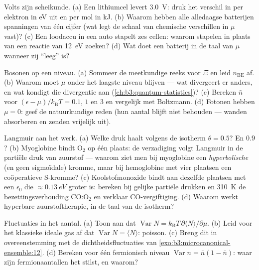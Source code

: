 \begin{exercise}[$\star$]\label{exo:b3:grand-canonical:4}
Volts zijn scheikunde. (a) Een lithiumcel levert \qty{3.0}{V}: druk het
verschil in  per elektron in eV uit en per mol in kJ.
(b) Waarom hebben alle alledaagse batterijen spanningen van één cijfer
(wat legt de schaal van chemische verschillen in $\mu$ vast)? (c) Een
loodaccu in een auto stapelt zes cellen: waarom stapelen in plaats van een
reactie van \qty{12}{eV} zoeken? (d) Wat doet een batterij in de taal van
$\mu$ wanneer zij ``leeg'' is?
\end{exercise}

\begin{exercise}[$\star\star$]\label{exo:b3:grand-canonical:5}
Bosonen op een niveau. (a) Sommeer de meetkundige reeks voor $\Xi$ en leid
$\bar n_{\text{BE}}$ af. (b) Waarom moet $\mu$ onder het laagste niveau
blijven --- wat divergeert er anders, en wat kondigt die divergentie aan
(\cref{ch:b3:quantum-statistics})? (c) Bereken $\bar n$ voor $(\epsilon - \mu)/k_{\text{B}}T = 0.1$, $1$ en $3$ en vergelijk met Boltzmann. (d)
Fotonen hebben $\mu = 0$: geef de natuurkundige reden (hun aantal blijft
niet behouden --- wanden absorberen en zenden vrijelijk uit).
\end{exercise}

\begin{exercise}[$\star\star$]\label{exo:b3:grand-canonical:6}
Langmuir aan het werk. (a) Welke druk haalt volgens de isotherm $\theta = 0.5$? En $0.9$? (b) Myoglobine bindt O$_2$ op één plaats: de verzadiging
volgt Langmuir in de partiële druk van zuurstof --- waarom ziet men bij
myoglobine een \emph{hyperbolische} (en geen sigmoïdale) kromme, maar bij
hemoglobine met vier plaatsen een coöperatieve S-kromme? (c)
Koolstofmonoxide bindt aan dezelfde plaatsen met een $\epsilon_0$ die
$\approx\qty{0.13}{eV}$ groter is: bereken bij gelijke partiële drukken en
\qty{310}{K} de bezettingsverhouding CO:O$_2$ en verklaar
CO-vergiftiging. (d) Waarom werkt hyperbare zuurstoftherapie, in de taal
van de isotherm?
\end{exercise}

\begin{exercise}[$\star\star$]\label{exo:b3:grand-canonical:7}
Fluctuaties in het aantal. (a) Toon aan dat $\operatorname{Var}N =
k_{\text{B}}T\,\partial\langle N\rangle/\partial\mu$. (b) Leid voor het
klassieke ideale gas af dat $\operatorname{Var}N = \langle
N\rangle$:
poisson. (c) Breng dit in overeenstemming met de dichtheidsfluctuaties van
\cref{exo:b3:microcanonical-ensemble:12}. (d) Bereken voor één fermionisch
niveau $\operatorname{Var}n = \bar n(1 - \bar
n)$: waar zijn
fermionaantallen het stilst, en waarom?
\end{exercise}

